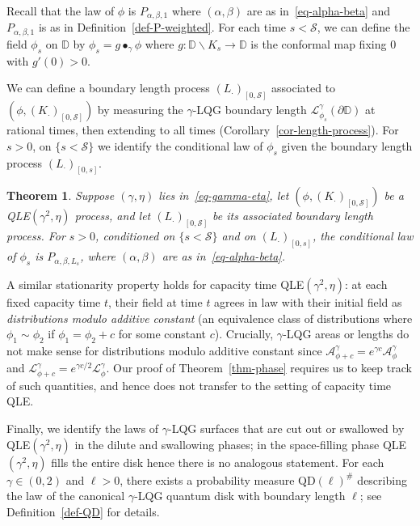 \documentclass[a4paper]{article}
\numberwithin{equation}{section}
\newcommand{\D}{\mathbb{D}}
\newcommand{\cA}{\mathcal{A}}
\newcommand{\cL}{\mathcal{L}}
\newcommand{\qduration}{\mathcal{S}}
\newcommand{\QD}{\mathrm{QD}}
\newtheorem{theorem}{Theorem}[section]
\theoremstyle{remark}
\numberwithin{equation}{section}
\begin{document}
Recall that the law of $\phi$ is $P_{\alpha, \beta, 1}$ where $(\alpha, \beta)$ are as in~\eqref{eq-alpha-beta} and $P_{\alpha,\beta,1}$ is as in Definition~\ref{def-P-weighted}. For each time $s < \qduration$, we can define the field $\phi_s$ on $\D$ by $\phi_s = g \bullet_\gamma \phi$  where $g: \D \backslash K_s \to \D$ is the conformal map fixing $0$ with $g'(0) >0$.

We can define a boundary length process $(L_\cdot)_{[0,\qduration]}$ associated to $(\phi, (K_\cdot)_{[0,\qduration]})$ by measuring the $\gamma$-LQG boundary length $\cL^\gamma_{\phi_s}(\partial \D)$ at rational times, then extending to all times (Corollary~\ref{cor-length-process}). For $s>0$, on $\{ s < \qduration\}$ we identify the conditional law of $\phi_s$ given the boundary length process $(L_\cdot)_{[0,s]}$. 

\begin{theorem}\label{thm-stationarity}
    Suppose $(\gamma, \eta)$ lies in~\eqref{eq-gamma-eta},  let $(\phi, (K_\cdot)_{[0, \qduration]})$ be a QLE$(\gamma^2, \eta)$ process, and let $(L_\cdot)_{[0, \qduration]}$ be its associated boundary length process. 
    For $s>0$, conditioned on $\{s < \qduration\}$ and on $(L_\cdot)_{[0,s]}$, the conditional law of $\phi_s$ is $P_{\alpha, \beta, L_s}$, where $(\alpha, \beta)$ are as in~\eqref{eq-alpha-beta}.
\end{theorem}

A similar stationarity property holds for capacity time QLE$(\gamma^2, \eta)$: at each fixed capacity time $t$, their field at time $t$ agrees in law with their initial field as \emph{distributions modulo additive constant} (an equivalence class of distributions where $\phi_1 \sim \phi_2$ if $\phi_1 = \phi_2+c$ for some constant $c$). Crucially, $\gamma$-LQG areas or lengths do not make sense for distributions modulo additive constant since $\cA^\gamma_{\phi + c} = e^{\gamma c} \cA^\gamma_\phi$ and $\cL^\gamma_{\phi + c} = e^{\gamma c/2} \cL^\gamma_\phi$. Our proof of Theorem~\ref{thm-phase} requires us to keep track of such quantities, and hence does not transfer to the setting of capacity time QLE.

Finally, we identify the laws of $\gamma$-LQG surfaces that are cut out or swallowed by QLE$(\gamma^2, \eta)$ in the dilute and swallowing phases; in the space-filling phase QLE$(\gamma^2, \eta)$ fills the entire disk hence there is no analogous statement. For each $\gamma \in (0,2)$ and $\ell > 0$, there exists a probability measure $\QD(\ell)^\#$ describing the law of the canonical $\gamma$-LQG quantum disk with boundary length $\ell$; see Definition~\ref{def-QD} for details. 
\end{document}
